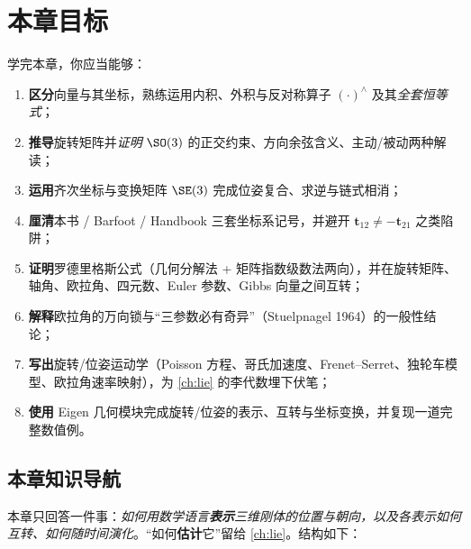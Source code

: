 \section*{本章目标}
学完本章，你应当能够：
\begin{enumerate}
  \item \textbf{区分}向量与其坐标，熟练运用内积、外积与反对称算子 $(\cdot)^\wedge$ 及其\emph{全套恒等式}；
  \item \textbf{推导}旋转矩阵并\emph{证明} $\SO(3)$ 的正交约束、方向余弦含义、主动/被动两种解读；
  \item \textbf{运用}齐次坐标与变换矩阵 $\SE(3)$ 完成位姿复合、求逆与链式相消；
  \item \textbf{厘清}本书 / Barfoot / Handbook 三套坐标系记号，并避开 $\mathbf{t}_{12}\neq-\mathbf{t}_{21}$ 之类陷阱；
  \item \textbf{证明}罗德里格斯公式（几何分解法 + 矩阵指数级数法两向），并在旋转矩阵、轴角、欧拉角、四元数、Euler 参数、Gibbs 向量之间互转；
  \item \textbf{解释}欧拉角的万向锁与“三参数必有奇异”（Stuelpnagel 1964）的一般性结论；
  \item \textbf{写出}旋转/位姿运动学（Poisson 方程、哥氏加速度、Frenet--Serret、独轮车模型、欧拉角速率映射），为 \cref{ch:lie} 的李代数埋下伏笔；
  \item \textbf{使用} Eigen 几何模块完成旋转/位姿的表示、互转与坐标变换，并复现一道完整数值例。
\end{enumerate}

\subsection*{本章知识导航}
本章只回答一件事：\emph{如何用数学语言\textbf{表示}三维刚体的位置与朝向，以及各表示如何互转、如何随时间演化}。“如何\textbf{估计}它”留给 \cref{ch:lie}。结构如下：

